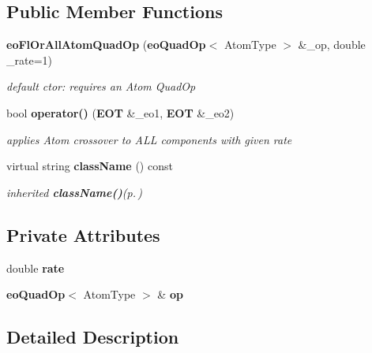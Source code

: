 \subsection*{Public Member Functions}
\begin{CompactItemize}
\item 
{\bf eo\-Fl\-Or\-All\-Atom\-Quad\-Op} ({\bf eo\-Quad\-Op}$<$ Atom\-Type $>$ \&\_\-op, double \_\-rate=1)\label{classeo_fl_or_all_atom_quad_op_a0}

\begin{CompactList}\small\item\em default ctor: requires an Atom Quad\-Op \item\end{CompactList}\item 
bool {\bf operator()} ({\bf EOT} \&\_\-eo1, {\bf EOT} \&\_\-eo2)\label{classeo_fl_or_all_atom_quad_op_a1}

\begin{CompactList}\small\item\em applies Atom crossover to ALL components with given rate \item\end{CompactList}\item 
virtual string {\bf class\-Name} () const \label{classeo_fl_or_all_atom_quad_op_a2}

\begin{CompactList}\small\item\em inherited {\bf class\-Name()}{\rm (p.\,\pageref{classeo_fl_or_all_atom_quad_op_a2})} \item\end{CompactList}\end{CompactItemize}
\subsection*{Private Attributes}
\begin{CompactItemize}
\item 
double {\bf rate}\label{classeo_fl_or_all_atom_quad_op_r0}

\item 
{\bf eo\-Quad\-Op}$<$ Atom\-Type $>$ \& {\bf op}\label{classeo_fl_or_all_atom_quad_op_r1}

\end{CompactItemize}


\subsection{Detailed Description}
